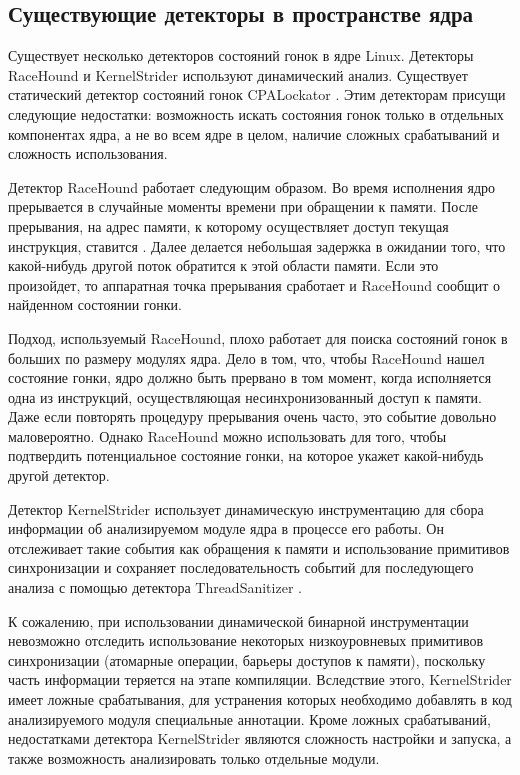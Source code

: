 
\subsection{Существующие детекторы в пространстве ядра}

Существует несколько детекторов состояний гонок в ядре Linux.
Детекторы RaceHound \cite{race-hound} и KernelStrider \cite{kernel-strider} используют динамический анализ.
Существует статический детектор состояний гонок CPALockator \cite{cpa-lockator}.
Этим детекторам присущи следующие недостатки: возможность искать состояния гонок только в отдельных компонентах ядра, а не во всем ядре в целом, наличие сложных срабатываний и сложность использования.

Детектор RaceHound \cite{race-hound} работает следующим образом.
Во время исполнения ядро прерывается в случайные моменты времени при обращении к памяти.
После прерывания, на адрес памяти, к которому осуществляет доступ текущая инструкция, ставится .
Далее делается небольшая задержка в ожидании того, что какой-нибудь другой поток обратится к этой области памяти.
Если это произойдет, то аппаратная точка прерывания сработает и RaceHound сообщит о найденном состоянии гонки.

Подход, используемый RaceHound, плохо работает для поиска состояний гонок в больших по размеру модулях ядра.
Дело в том, что, чтобы RaceHound нашел состояние гонки, ядро должно быть прервано в том момент, когда исполняется одна из инструкций, осуществляющая несинхронизованный доступ к памяти.
Даже если повторять процедуру прерывания очень часто, это событие довольно маловероятно.
Однако RaceHound можно использовать для того, чтобы подтвердить потенциальное состояние гонки, на которое укажет какой-нибудь другой детектор.

Детектор KernelStrider \cite{kernel-strider} использует динамическую инструментацию для сбора информации об анализируемом модуле ядра в процессе его работы.
Он отслеживает такие события как обращения к памяти и использование примитивов синхронизации и сохраняет последовательность событий для последующего анализа с помощью детектора ThreadSanitizer \cite{tsan}.

К сожалению, при использовании динамической бинарной инструментации невозможно отследить использование некоторых низкоуровневых примитивов синхронизации (атомарные операции, барьеры доступов к памяти), поскольку часть информации теряется на этапе компиляции.
Вследствие этого, KernelStrider имеет ложные срабатывания, для устранения которых необходимо добавлять в код анализируемого модуля специальные аннотации.
Кроме ложных срабатываний, недостатками детектора KernelStrider являются сложность настройки и запуска, а также возможность анализировать только отдельные модули.

